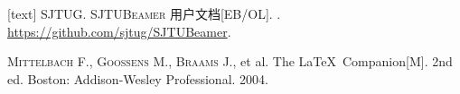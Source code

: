 \documentclass{ctexbeamer}
\begin{document}
\begin{frame}
  \begin{thebibliography}{00}
    [text]
     \textsc{SJTUG}.
    \newblock \textsc{SJTUBeamer} 用户文档[EB/OL].
    \newblock{}.
    \url{https://github.com/sjtug/SJTUBeamer}.
  \end{thebibliography}
  \begin{bibliolist}{00}
    \bookitem \textsc{Mittelbach F.}, \textsc{Goossens M.}, \textsc{Braams J.}, et al.
    \newblock The \LaTeX\ Companion[M].
    \newblock\newblock 2nd ed. Boston: Addison-Wesley Professional. 2004.
  \end{bibliolist}
\end{frame}
\end{document}
